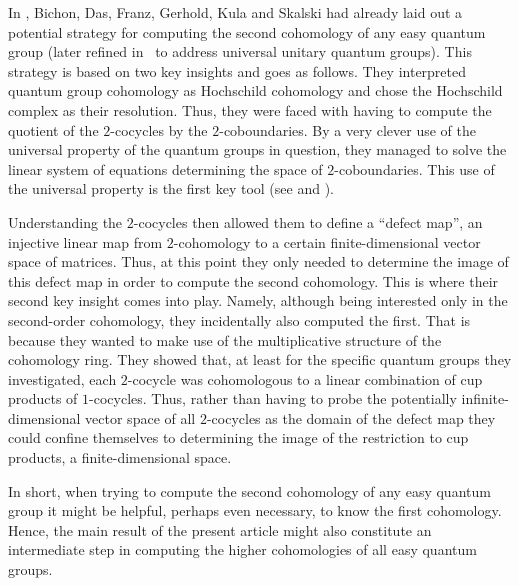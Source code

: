 \documentclass[pdftex]{sigma}
\numberwithin{equation}{section}
\begin{document}
In \cite{BichonFranzGerhold2017, DasFranzKulaSkalski2018}, Bichon, Das, Franz, Gerhold, Kula and Skalski had already laid out a potential strategy for computing the second cohomology of any easy quantum group (later refined in~\cite{DasFranzKulaSkalski2023} to address  universal unitary quantum groups). This strategy is based on two key insights and goes as follows. They interpreted quantum group cohomology as Hochschild cohomology and chose the Hochschild complex as their resolution. Thus, they were faced with having to compute the quotient of the $2$-cocycles by the $2$-coboundaries. By a very clever use of the universal property of the quantum groups in question,  they managed to solve the linear system of equations determining the space of $2$-coboundaries. This use of the universal property is the first key tool (see \cite[Lemma~5.4]{BichonFranzGerhold2017} and \cite[Lemma~4.1]{DasFranzKulaSkalski2018}).

Understanding the $2$-cocycles then allowed them to define a ``defect map'', an injective linear map  from  $2$-cohomology to a certain finite-dimensional vector space of matrices. Thus, at this point they only needed to determine the image of this defect map in order to compute the second cohomology. This is where their second key insight  comes into play. Namely, although being interested only in the second-order cohomology, they incidentally also computed the first. That is because they wanted to make  use of the multiplicative structure of the cohomology ring. They showed that, at least for the specific quantum groups they investigated, each $2$-cocycle was cohomologous to a linear combination of cup products of $1$-cocycles. Thus, rather than having to probe the potentially infinite-dimensional vector space of all $2$-cocycles as the domain of the defect map they could confine themselves to determining the image of the restriction to cup products, a finite-dimensional space.

In short, when trying to compute the second cohomology of any easy quantum group it might be helpful, perhaps even necessary, to know the first cohomology. Hence, the main result of the present article might also constitute an intermediate step in computing the higher cohomologies of all easy quantum groups.
\end{document}
